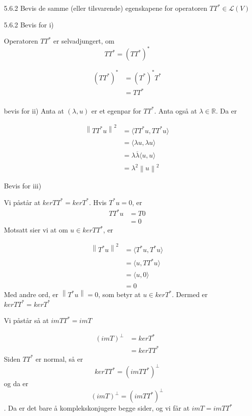 \documentclass[a4paper,norsk]{article}
\begin{document}
\begin{oppgavebox}{5.6.2}{}
Bevis de samme (eller tilsvarende) egenskapene for operatoren $ TT^* \in \mathcal{L}(V) $
\end{oppgavebox}

\begin{proofbox}{5.6.2}{}
Bevis for i)

Operatoren $ TT^* $ er selvadjungert, om
\[
    TT^* = \left( TT^* \right) ^*
\]
 
\begin{align*}
    \left( TT^* \right) ^* &= \left( T^* \right) ^* T^* \\
    &= TT^*
\end{align*}\\


bevis for ii)
Anta at $ ( \lambda , u )$ er et egenpar for $ TT^* $. Anta også at $ \lambda \in \mathbb{R} $. Da er 

\begin{align*}
    \left\lVert TT^*u \right\rVert ^2 &= \langle TT^*u, TT^*u  \rangle_{  } \\
    &= \langle \lambda u, \lambda u  \rangle_{  } \\
    &= \lambda  \overline{\lambda } \langle u, u \rangle_{  }\\
    &= \lambda ^2 \left\lVert u \right\rVert ^2 
\end{align*}

Bevis for iii)

Vi påstår at $ ker TT^* = kerT^* $. Hvis $ T^*u= 0 $, er
\begin{align*}
    TT^*u &= T0\\
    &= 0
\end{align*}
Motsatt sier vi at om $ u \in ker TT^* $, er 

\begin{align*}
    \left\lVert T^*u \right\rVert ^2 &= \langle T^*u, T^*u \rangle_{  }\\
    &= \langle u, TT^*u \rangle_{  }  \\
    &= \langle u, 0 \rangle_{  } \\
    &= 0
\end{align*}
Med andre ord, er $ \left\lVert T^*u \right\rVert =0 $, som betyr at $ u \in ker T^* $. Dermed er $ kerTT^* = kerT^* $


Vi påstår så at $ imTT^* = imT $ 

\begin{align*}
    \left( imT \right) ^{\bot} &= kerT^*\\
    &= kerTT^*
\end{align*}
Siden $ TT^*  $ er normal, så er 
\[
    kerTT^* = \left( imTT^* \right) ^{\bot}
\]
og da er $$ \left( imT \right) ^{\bot} = \left( imTT^* \right)^{\bot}  $$. Da er det bare å komplekskonjugere begge sider, og vi får at $ imT = imTT^* $ 
\end{proofbox}
\end{document}
